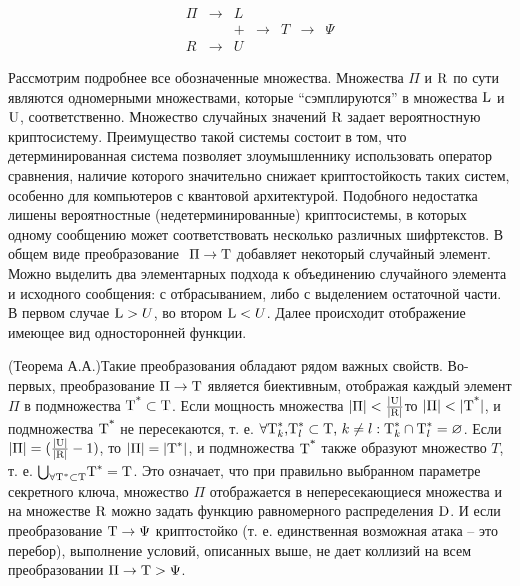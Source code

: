     \[ \begin{array}{ccccccc}
    \Pi  & \to  & L &  &  &  &  \\ 
    &  & + & \to  & T & \to  & \Psi  \\ 
    R & \to  & U &  &  &  &  \end{array}
    \] 
    
    Рассмотрим подробнее все обозначенные множества. Множества $\Pi $ и ${\textrm R}$ по сути являются одномерными множествами, которые ``сэмплируются'' в  множества ${\textrm L}$ и ${\textrm U}$, соответственно. Множество случайных значений ${\textrm R}$ задает вероятностную криптосистему. Преимущество такой системы состоит в том, что детерминированная система позволяет злоумышленнику использовать оператор сравнения, наличие которого значительно снижает криптостойкость таких систем, особенно для компьютеров с квантовой архитектурой. Подобного недостатка лишены вероятностные (недетерминированные) криптосистемы, в которых одному сообщению может соответствовать несколько различных шифртекстов. В общем виде преобразование $\ \Pi \to {\textrm T}$ добавляет некоторый случайный элемент. Можно выделить два элементарных подхода к объединению случайного элемента и исходного сообщения: с отбрасыванием, либо с выделением остаточной части. В первом случае ${\textrm L}>U$, во втором ${\textrm L}<U$. Далее происходит отображение имеющее вид односторонней функции.
    
    (Теорема А.А.)Такие преобразования обладают рядом важных свойств. Во-первых, преобразование $\Pi \to {\textrm T}$ является биективным, отображая каждый элемент $\Pi $ в подмножества ${{\textrm T}}^{{\textrm *}}\subset {\textrm T}$. Если мощность множества $|\Pi |<\frac{|{\textrm U}|}{|{\textrm R}|}$\cmm то $|\Pi |<|{{\textrm T}}^{{\textrm *}}|$, и подмножества ${{\textrm T}}^{{\textrm *}}$ не пересекаются, т. е. $\forall \textrm{T}^{*}_k \textrm{,} {\textrm T}^*_l\subset {\textrm T}\textrm{,}\ k\ne l:{{\textrm T}}^*_k\cap {{\textrm T}}^*_l=\varnothing $. Если $|\Pi |=(\frac{|{\textrm U}|}{|{\textrm R}|}-1)$, то $|\Pi |=|{{\textrm T}}^*|$, и подмножества ${{\textrm T}}^{{\textrm *}}$ также образуют множество $T$, т. е. ${\bigcup }_{\forall {{\textrm T}}^*\subset {\textrm T}}{{\textrm T}}^*={\textrm T}$. Это означает, что при правильно выбранном параметре секретного ключа, множество $\Pi $ отображается в непересекающиеся множества и на множестве ${\textrm R}$ можно задать функцию равномерного распределения ${\textrm D}$. И если преобразование ${\textrm T}\to \Psi $ криптостойко (т. е. единственная возможная атака -- это перебор), выполнение условий, описанных выше, не дает коллизий на всем преобразовании $\Pi \to {\textrm T}>\Psi $.
    
